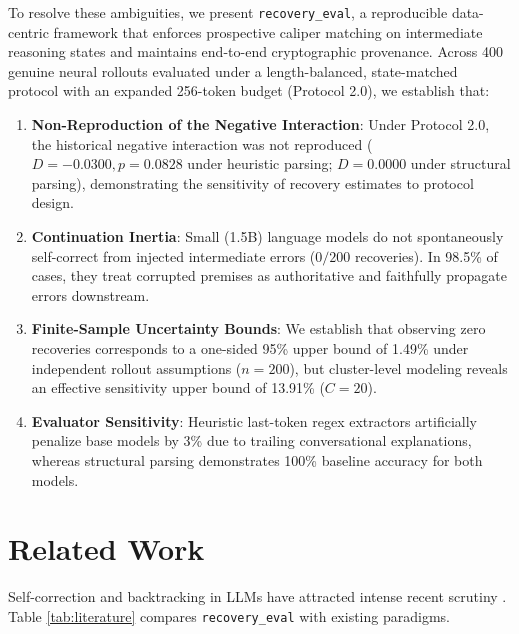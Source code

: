 \documentclass[10pt,conference]{IEEEtran}
\begin{document}
To resolve these ambiguities, we present \texttt{recovery\_eval}, a reproducible data-centric framework that enforces prospective caliper matching on intermediate reasoning states and maintains end-to-end cryptographic provenance. Across 400 genuine neural rollouts evaluated under a length-balanced, state-matched protocol with an expanded 256-token budget (Protocol 2.0), we establish that:
\begin{enumerate}
    \item \textbf{Non-Reproduction of the Negative Interaction}: Under Protocol 2.0, the historical negative interaction was not reproduced ($D = -0.0300, p = 0.0828$ under heuristic parsing; $D = 0.0000$ under structural parsing), demonstrating the sensitivity of recovery estimates to protocol design.
    \item \textbf{Continuation Inertia}: Small (1.5B) language models do not spontaneously self-correct from injected intermediate errors ($0/200$ recoveries). In 98.5\% of cases, they treat corrupted premises as authoritative and faithfully propagate errors downstream.
    \item \textbf{Finite-Sample Uncertainty Bounds}: We establish that observing zero recoveries corresponds to a one-sided 95\% upper bound of 1.49\% under independent rollout assumptions ($n=200$), but cluster-level modeling reveals an effective sensitivity upper bound of 13.91\% ($C=20$).
    \item \textbf{Evaluator Sensitivity}: Heuristic last-token regex extractors artificially penalize base models by 3\% due to trailing conversational explanations, whereas structural parsing demonstrates 100\% baseline accuracy for both models.
\end{enumerate}

\section{Related Work}
Self-correction and backtracking in LLMs have attracted intense recent scrutiny \cite{snell2024scaling, wang2022selfconsistency, huang2023large}. Table \ref{tab:literature} compares \texttt{recovery\_eval} with existing paradigms.

\begin{table}[htbp]
\caption{Comparison with Existing Reasoning Evaluation Frameworks}
\label{tab:literature}
\centering
{}
\end{table}
\end{document}
